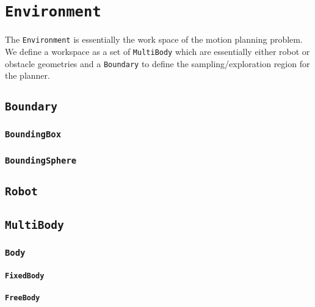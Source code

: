 \section{\texttt{Environment}}

The \texttt{Environment} is essentially the work space of the motion planning
problem. We define a workspace as a set of \texttt{MultiBody} which are
essentially either robot or obstacle geometries and a \texttt{Boundary} to
define the sampling/exploration region for the planner.

\subsection{\texttt{Boundary}}

\subsubsection{\texttt{BoundingBox}}

\subsubsection{\texttt{BoundingSphere}}

\subsection{\texttt{Robot}}

\subsection{\texttt{MultiBody}}

\subsubsection{\texttt{Body}}

\paragraph{\texttt{FixedBody}}

\paragraph{\texttt{FreeBody}}

